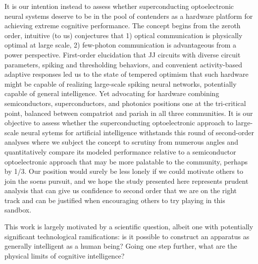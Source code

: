 \documentclass[onecolumn]{article}
\begin{document}
It is our intention instead to assess whether superconducting optoelectronic neural systems deserve to be in the pool of contenders as a hardware platform for achieving extreme cognitive performance. The concept begins from the zeroth order, intuitive (to us) conjectures that 1) optical communication is physically optimal at large scale, 2) few-photon communication is advantageous from a power perspective. First-order elucidation that JJ circuits with diverse circuit parameters, spiking and thresholding behaviors, and convenient activity-based adaptive responses led us to the state of tempered optimism that such hardware might be capable of realizing large-scale spiking neural networks, potentially capable of general intelligence. Yet advocating for hardware combining semiconductors, superconductors, and photonics positions one at the tri-critical point, balanced between compatriot and pariah in all three communities. It is our objective to assess whether the superconducting optoelectronic approach to large-scale neural sytems for artificial intelligence withstands this round of second-order analyses where we subject the concept to scrutiny from numerous angles and quantitatively compare its modeled performance relative to a semiconductor optoelectronic approach that may be more palatable to the community, perhaps by 1/3. Our position would surely be less lonely if we could motivate others to join the soens pursuit, and we hope the study presented here represents prudent analysis that can give us confidence to second order that we are on the right track and can be justified when encouraging others to try playing in this sandbox.

This work is largely motivated by a scientific question, albeit one with potentially significant technological ramifications: is it possible to construct an apparatus as generally intelligent as a human being? Going one step further, what are the physical limits of cognitive intelligence?
\end{document}
